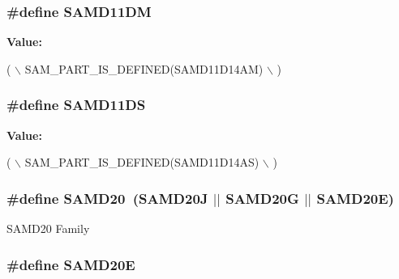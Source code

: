 \hypertarget{group__sam__part__macros__group_gaa3d39f43fd1dfb13a8e3769dadd3a3b2}{
\subsubsection[{S\-A\-M\-D11\-D\-M}]{\setlength{\rightskip}{0pt plus 5cm}\#define S\-A\-M\-D11\-D\-M}}\label{group__sam__part__macros__group_gaa3d39f43fd1dfb13a8e3769dadd3a3b2}
{\bfseries Value\-:}
\begin{DoxyCode}
( \(\backslash\)
                SAM\_PART\_IS\_DEFINED(SAMD11D14AM) \(\backslash\)
        )
\end{DoxyCode}
\hypertarget{group__sam__part__macros__group_ga5a5c9017efa9764ece7e1e7fee1f5866}{
\subsubsection[{S\-A\-M\-D11\-D\-S}]{\setlength{\rightskip}{0pt plus 5cm}\#define S\-A\-M\-D11\-D\-S}}\label{group__sam__part__macros__group_ga5a5c9017efa9764ece7e1e7fee1f5866}
{\bfseries Value\-:}
\begin{DoxyCode}
( \(\backslash\)
                SAM\_PART\_IS\_DEFINED(SAMD11D14AS) \(\backslash\)
        )
\end{DoxyCode}
\hypertarget{group__sam__part__macros__group_gad9193543e761f5967353a0464dde1e61}{
\subsubsection[{S\-A\-M\-D20}]{\setlength{\rightskip}{0pt plus 5cm}\#define S\-A\-M\-D20~(S\-A\-M\-D20\-J $|$$|$ S\-A\-M\-D20\-G $|$$|$ S\-A\-M\-D20\-E)}}\label{group__sam__part__macros__group_gad9193543e761f5967353a0464dde1e61}
S\-A\-M\-D20 Family \hypertarget{group__sam__part__macros__group_ga4540be1fa82a17932c6000a0919806b0}{
\subsubsection[{S\-A\-M\-D20\-E}]{\setlength{\rightskip}{0pt plus 5cm}\#define S\-A\-M\-D20\-E}}\label{group__sam__part__macros__group_ga4540be1fa82a17932c6000a0919806b0}
